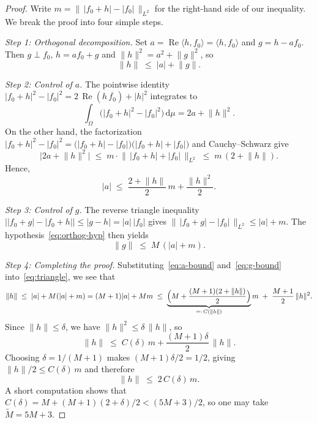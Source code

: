 \documentclass[11pt]{amsart}
\theoremstyle{remark}
\begin{document}
\begin{proof}
Write $m = \bigl\|\, \lvert f_0 + h \rvert - \lvert f_0 \rvert \,\bigr\|_{L^2}$ for the right-hand side of our inequality. We break the proof into four simple steps.

\medskip
\noindent
\emph{Step 1: Orthogonal decomposition.}\;
Set $a = \operatorname{Re}\langle h,f_0\rangle = \langle h,f_0\rangle$ and
$g = h - a f_0$.  Then $g \perp f_0$, $h = af_0 + g$ and
$\lVert h \rVert^2 = a^2 + \lVert g \rVert^2$, so
\begin{equation}\label{eq:triangle}
\lVert h \rVert \;\le\; \lvert a \rvert + \lVert g \rVert.
\end{equation}

\medskip
\noindent
\emph{Step 2: Control of $a$.}\;
The pointwise identity
$\lvert f_0 + h \rvert^2 - \lvert f_0 \rvert^2
= 2\,\operatorname{Re}(h\,\overline{f_0}) + \lvert h \rvert^2$
integrates to
\[
\int_\Omega \bigl(\lvert f_0 + h \rvert^2 - \lvert f_0 \rvert^2\bigr)\,\mathrm{d}\mu
= 2a + \lVert h \rVert^2.
\]
On the other hand, the factorization
$\lvert f_0 + h \rvert^2 - \lvert f_0 \rvert^2
= \bigl(\lvert f_0 + h \rvert - \lvert f_0 \rvert\bigr)
  \bigl(\lvert f_0 + h \rvert + \lvert f_0 \rvert\bigr)$
and Cauchy--Schwarz give
\[
\lvert 2a + \lVert h \rVert^2 \rvert
\;\le\;
m \cdot \bigl\|\, \lvert f_0 + h \rvert + \lvert f_0 \rvert \,\bigr\|_{L^2}
\;\le\;
m\,(2 + \lVert h \rVert).
\]
Hence,
\begin{equation}\label{eq:a-bound}
\lvert a \rvert
\;\le\;
\frac{2 + \lVert h \rVert}{2}\, m
+ \frac{\lVert h \rVert^2}{2}.
\end{equation}

\medskip
\noindent
\emph{Step 3: Control of $g$.}\;
The reverse triangle inequality
$\bigl\lvert \lvert f_0 + g \rvert - \lvert f_0 + h \rvert \bigr\rvert
\le \lvert g - h \rvert = \lvert a \rvert\,\lvert f_0 \rvert$
gives
$\bigl\|\, \lvert f_0 + g \rvert - \lvert f_0 \rvert \,\bigr\|_{L^2}
\le \lvert a \rvert + m$.
The hypothesis~\eqref{eq:orthog-hyp} then yields
\begin{equation}\label{eq:g-bound}
\lVert g \rVert \;\le\; M\,(\lvert a \rvert + m).
\end{equation}

\medskip
\noindent
\emph{Step 4: Completing the proof.}\;
Substituting~\eqref{eq:a-bound} and~\eqref{eq:g-bound}
into~\eqref{eq:triangle}, we see that
\[
\lVert h \rVert
\;\le\;
\lvert a \rvert + M(\lvert a \rvert + m)
= (M+1)\lvert a \rvert + Mm
\;\le\;
\underbrace{\Bigl(M + \frac{(M+1)(2+\lVert h \rVert)}{2}\Bigr)}_{=:\, C(\lVert h \rVert)}
m
\;+\; \frac{M+1}{2}\,\lVert h \rVert^2.
\]
Since $\lVert h \rVert \le \delta$, we have $\lVert h \rVert^2 \le \delta\,\lVert h \rVert$, so
\[
\lVert h \rVert
\;\le\; C(\delta)\, m + \frac{(M+1)\delta}{2}\,\lVert h \rVert.
\]
Choosing $\delta = 1/(M+1)$ makes $(M+1)\delta/2 = 1/2$, giving
$\lVert h \rVert/2 \le C(\delta)\, m$ and therefore
\[
\lVert h \rVert \;\le\; 2\, C(\delta)\, m.
\]
A short computation shows that
$C(\delta) = M + (M+1)(2 + \delta)/2 < (5M+3)/2$, so one may take
$\widetilde{M} = 5M + 3$.
\end{proof}
\end{document}
